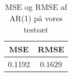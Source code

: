 \begin{table}
\center
\begin{tabular}{cc}
\toprule
 MSE & RMSE \\ \midrule
 0.1192 & 0.1629 \\ \bottomrule
\end{tabular}
\caption{MSE og RMSE af AR(1) på vores testsæt} \label{tab:ar_tab}
\end{table}
